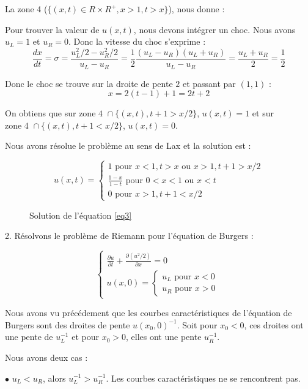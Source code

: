 \documentclass{article}
\begin{document}
La zone 4 ($\{(x,t) \in R \times R^+, x > 1, t > x\}$), nous donne :

Pour trouver la valeur de $u(x,t)$, nous devons intégrer un choc. Nous avons $u_L=1$ et $u_R=0$. Donc la vitesse du choc s'exprime :
\[ \frac{dx}{dt} = \sigma = \frac{u_L^2/2 - u_R^2/2}{u_L - u_R} = \frac{1}{2} \frac{(u_L-u_R)(u_L+u_R)}{u_L-u_R} = \frac{u_L+u_R}{2} = \frac{1}{2} \]

Donc le choc se trouve sur la droite de pente $2$ et passant par $(1,1)$ :
\[ x = 2 (t - 1) + 1 = 2t + 2 \]

On obtiens que sur $\text{zone 4 } \cap \{(x,t), t+1 > x/2\}$, $u(x,t) = 1$ et sur $\text{zone 4 } \cap \{(x,t), t+1 < x/2\}$, $u(x,t) = 0$.
\newline

Nous avons résolue le problème au sens de Lax et la solution est : 

\[u(x,t) = \left\{ \begin{matrix}
	1 \text{ pour } x<1, t>x \text{ ou } x>1, t+1>x/2 \\
	\frac{1-x}{1-t} \text{ pour } 0<x<1 \text{ ou } x<t \\
	0 \text{ pour } x>1, t+1<x/2
\end{matrix} \right.
\tag{Sol3}
\]

\begin{figure}
  
  \caption{Solution de l'équation \ref{eq3}}
\end{figure}

2. Résolvons le problème de Riemann pour l'équation de Burgers :

\[ \left\{ \begin{matrix}
	\frac{\partial u}{\partial t} + \frac{\partial (u^2/2)}{\partial x} = 0 \\
	u(x,0) = \left\{ \begin{matrix}
					u_L \text{ pour } x<0 \\
					u_R \text{ pour } x>0
	\end{matrix} \right.
\end{matrix} \right.
\label{eq4} \tag{Burgers2}
\]

Nous avons vu précédement que les courbes caractéristiques de l'équation de Burgers sont des droites de pente $u(x_0,0)^{-1}$. Soit pour $x_0<0$, ces droites ont une pente de $u_L^{-1}$ et pour $x_0>0$, elles ont une pente $u_R^{-1}$.
\newline

Nous avons deux cas :

$\bullet$ $u_L < u_R$, alors $u_L^{-1} > u_R^{-1}$. Les courbes caractéristiques ne se rencontrent pas.
\end{document}
